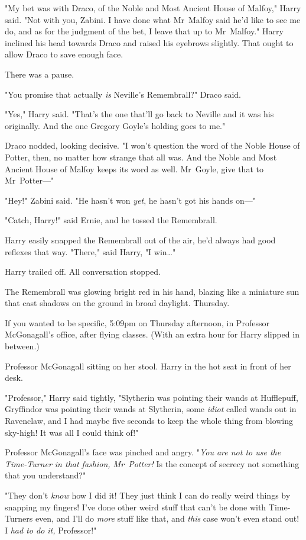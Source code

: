 "My bet was with Draco, of the Noble and Most Ancient House of Malfoy," Harry
said. "Not with you, Zabini. I have done what Mr~Malfoy said he’d like to see
me do, and as for the judgment of the bet, I leave that up to Mr~Malfoy."
Harry inclined his head towards Draco and raised his eyebrows slightly. That
ought to allow Draco to save enough face.

There was a pause.

"You promise that actually \emph{is} Neville’s Remembrall?" Draco said.

"Yes," Harry said. "That’s the one that’ll go back to Neville and it was his
originally. And the one Gregory Goyle’s holding goes to me."

Draco nodded, looking decisive. "I won’t question the word of the Noble House
of Potter, then, no matter how strange that all was. And the Noble and Most
Ancient House of Malfoy keeps its word as well. Mr~Goyle, give that to
Mr~Potter—"

"Hey!" Zabini said. "He hasn’t won \emph{yet}, he hasn’t got his hands on—"

"Catch, Harry!" said Ernie, and he tossed the Remembrall.

Harry easily snapped the Remembrall out of the air, he’d always had good
reflexes that way. "There," said Harry, "I win…"

Harry trailed off. All conversation stopped.

The Remembrall was glowing bright red in his hand, blazing like a miniature sun
that cast shadows on the ground in broad daylight.
\later
Thursday.

If you wanted to be specific, 5:09pm on Thursday afternoon, in Professor
McGonagall’s office, after flying classes. (With an extra hour for Harry
slipped in between.)

Professor McGonagall sitting on her stool. Harry in the hot seat in front of
her desk.

"Professor," Harry said tightly, "Slytherin was pointing their wands at
Hufflepuff, Gryffindor was pointing their wands at Slytherin, some \emph{idiot}
called wands out in Ravenclaw, and I had maybe five seconds to keep the whole
thing from blowing sky-high! It was all I could think of!"

Professor McGonagall’s face was pinched and angry. "\emph{You are not to use
the Time-Turner in that fashion, Mr~Potter!} Is the concept of secrecy not
something that you understand?"

"They don’t \emph{know} how I did it! They just think I can do really weird
things by snapping my fingers! I’ve done other weird stuff that can’t be done
with Time-Turners even, and I’ll do \emph{more} stuff like that, and
\emph{this} case won’t even stand out! I \emph{had to do it,} Professor!"

